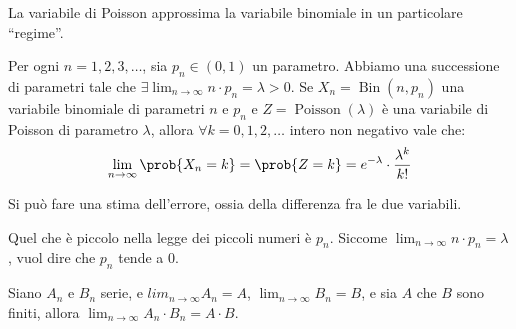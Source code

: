 La variabile di Poisson approssima la variabile binomiale in un particolare ``regime''.

\begin{prop}
Per ogni $n = 1, 2, 3, \dots$, sia $p_n \in (0,1)$ un parametro. Abbiamo una successione di parametri tale che $\exists \lim_{n \to \infty} n \cdot p_n = \lambda > 0$. Se $X_n = \operatorname{Bin}(n, p_n)$ una variabile binomiale di parametri $n$ e $p_n$ e $Z = \operatorname{Poisson}(\lambda)$ \`e una variabile di Poisson di parametro $\lambda$, allora $\forall k = 0, 1, 2, \dots$ intero non negativo vale che:
\[
\lim_{n \to \infty} \prob{X_n = k} = \prob{Z = k} = e^{-\lambda} \cdot \frac{\lambda^k}{k!}
\]
\end{prop}
Si pu\`o fare una stima dell'errore, ossia della differenza fra le due variabili.

Quel che \`e piccolo nella legge dei piccoli numeri \`e $p_n$. Siccome $\lim_{n \to \infty} n \cdot p_n = \lambda$, vuol dire che $p_n$ tende a 0.

Siano $A_n$ e $B_n$ serie, e $lim_{n \to \infty} A_n = A$, $\lim_{n \to \infty} B_n = B$, e sia $A$ che $B$ sono finiti, allora $\lim_{n \to \infty} A_n \cdot B_n = A \cdot B$.

